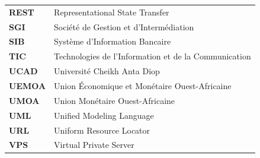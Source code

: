 \begin{longtable}{@{}p{2.5cm}p{10.5cm}}
\textbf{REST}    & Representational State Transfer \\[2pt]
\textbf{SGI}     & Société de Gestion et d'Intermédiation \\[2pt]
\textbf{SIB}     & Système d'Information Bancaire \\[2pt]
\textbf{TIC}     & Technologies de l'Information et de la Communication \\[2pt]
\textbf{UCAD}    & Université Cheikh Anta Diop \\[2pt]
\textbf{UEMOA}   & Union Économique et Monétaire Ouest-Africaine \\[2pt]
\textbf{UMOA}    & Union Monétaire Ouest-Africaine \\[2pt]
\textbf{UML}     & Unified Modeling Language \\[2pt]
\textbf{URL}     & Uniform Resource Locator \\[2pt]
\textbf{VPS}     & Virtual Private Server \\[2pt]
\end{longtable}
\endgroup
\cleardoublepage
